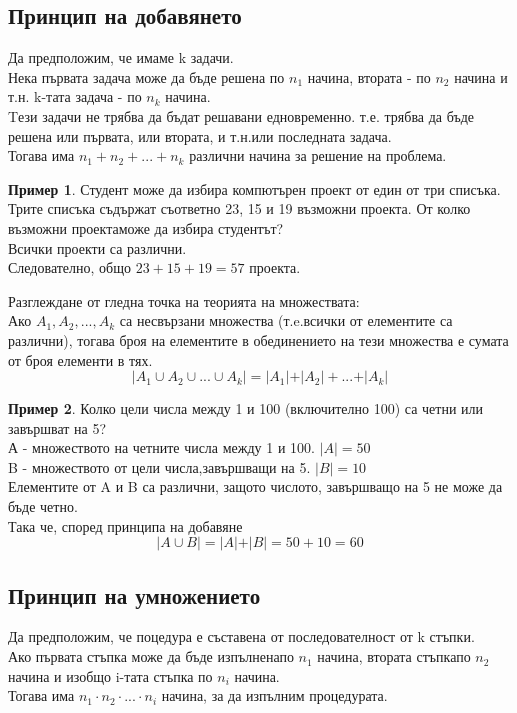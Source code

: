 \documentclass[fleqn, 12pt]{article}
\theoremstyle{definition}
\newtheorem{example}{Пример}[subsection]
\begin{document}
\subsection{Принцип на добавянето}
Да предположим, че имаме k задачи. \\
Нека първата задача може да бъде решена по $n_1$ начина, втората - по $n_2$ начина  и т.н. k-тата задача - по $n_k$ начина.\\
Tези задачи не трябва да бъдат решавани едновременно. т.е. трябва да бъде решена или първата, или втората, и т.н.или последната задача.\\
Тогава има $n_1 + n_2 + ... + n_k$ различни начина за решение на проблема.
\begin{example}
Студент може да избира компютърен проект от един от три списъка.
Трите списъка съдържат съответно 23, 15 и 19 възможни проекта. 
От колко възможни проектаможе да избира студентът?\\
Всички проекти са различни.\\
Следователно, общо $23 + 15 + 19 = 57$ проекта.
\end{example}

Разглеждане от гледна точка на теорията на множествата: \\
Ако $A_1, A_2, ..., A_k$ са несвързани множества (т.e.всички от елементите са различни), тогава броя на елементите в обединението на тези множества е сумата от броя елементи в тях.
$$\vert A_1 \cup A_2 \cup ... \cup A_k \vert = \vert A_1 \vert + \vert A_2 \vert +... + \vert A_k \vert $$

\begin{example}
Колко цели числа между 1 и 100 (включително 100) са четни или завършват на 5?\\
А - множеството на четните числа между 1 и 100. $\vert A \vert = 50$ \\
B - множеството от цели числа,завършващи на 5. $\vert B \vert = 10$\\
Елементите от A и B са различни, защото числото, завършващо на 5 не може да бъде четно.\\
Така че, според принципа на добавяне
$$\vert A \cup B \vert = \vert A \vert + \vert B \vert = 50 + 10 = 60$$
\end{example}

\subsection{Принцип на умножението}
Да предположим, че поцедура е съставена от последователност от k стъпки. \\
Ако първата стъпка може да бъде изпълненапо $n_1$ начина, втората стъпкапо $n_2$ начина и изобщо i-тата стъпка по $n_i$ начина. \\
Тогава има $n_1 \cdot n_2 \cdot ... \cdot n_i$ начина, за да изпълним процедурата. 
\end{document}

